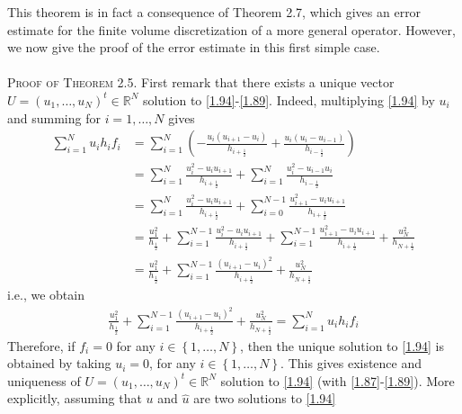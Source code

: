 \documentclass[a4paper]{article}
\numberwithin{equation}{section}
\begin{document}
This theorem is in fact a consequence of Theorem 2.7, which gives an error estimate for the finite volume discretization of a more general operator. However, we now give the proof of the error estimate in this first simple case.\\
\\
\textsc{Proof of Theorem 2.5.} First remark that there exists a unique vector $U = {\left( {{u_1}, \ldots ,{u_N}} \right)^t} \in {\mathbb{R}^N}$ solution to \eqref{1.94}-\eqref{1.89}. Indeed, multiplying \eqref{1.94} by $u_i$ and summing for $i=1,\ldots,N$ gives
\begin{align}
\sum\limits_{i = 1}^N {{u_i}{h_i}{f_i}}  &= \sum\limits_{i = 1}^N {\left( { - \frac{{{u_i}\left( {{u_{i + 1}} - {u_i}} \right)}}{{{h_{i + \frac{1}{2}}}}} + \frac{{{u_i}\left( {{u_i} - {u_{i - 1}}} \right)}}{{{h_{i - \frac{1}{2}}}}}} \right)} \\
& = \sum\limits_{i = 1}^N {\frac{{u_i^2 - {u_i}{u_{i + 1}}}}{{{h_{i + \frac{1}{2}}}}}}  + \sum\limits_{i = 1}^N {\frac{{u_i^2 - {u_{i - 1}}{u_i}}}{{{h_{i - \frac{1}{2}}}}}} \\
 &= \sum\limits_{i = 1}^N {\frac{{u_i^2 - {u_i}{u_{i + 1}}}}{{{h_{i + \frac{1}{2}}}}}}  + \sum\limits_{i = 0}^{N - 1} {\frac{{u_{i + 1}^2 - {u_i}{u_{i + 1}}}}{{{h_{i + \frac{1}{2}}}}}} \\
& = \frac{{u_1^2}}{{{h_{\frac{1}{2}}}}} + \sum\limits_{i = 1}^{N - 1} {\frac{{u_i^2 - {u_i}{u_{i + 1}}}}{{{h_{i + \frac{1}{2}}}}}}  + \sum\limits_{i = 1}^{N - 1} {\frac{{u_{i + 1}^2 - {u_i}{u_{i + 1}}}}{{{h_{i + \frac{1}{2}}}}}}  + \frac{{u_N^2}}{{{h_{N + \frac{1}{2}}}}}\\
& = \frac{{u_1^2}}{{{h_{\frac{1}{2}}}}} + \sum\limits_{i = 1}^{N - 1} {\frac{{{{\left( {{u_{i + 1}} - {u_i}} \right)}^2}}}{{{h_{i + \frac{1}{2}}}}}}  + \frac{{u_N^2}}{{{h_{N + \frac{1}{2}}}}}
\end{align}
i.e., we obtain
\begin{align}
\label{2.8}
\frac{{u_1^2}}{{{h_{\frac{1}{2}}}}} + \sum\limits_{i = 1}^{N - 1} {\frac{{{{\left( {{u_{i + 1}} - {u_i}} \right)}^2}}}{{{h_{i + \frac{1}{2}}}}}}  + \frac{{u_N^2}}{{{h_{N + \frac{1}{2}}}}} = \sum\limits_{i = 1}^N {{u_i}{h_i}{f_i}} 
\end{align}
Therefore, if $f_i=0$ for any $i \in \left\{ {1, \ldots ,N} \right\}$, then the unique solution to \eqref{1.94} is obtained by taking $u_i=0$, for any $i \in \left\{ {1, \ldots ,N} \right\}$. This gives existence and uniqueness of $U = {\left( {{u_1}, \ldots ,{u_N}} \right)^t} \in {\mathbb{R}^N}$ solution to \eqref{1.94} (with \eqref{1.87}-\eqref{1.89}). More explicitly, assuming that $u$ and $\widehat u$ are two solutions to \eqref{1.94}
\end{document}
